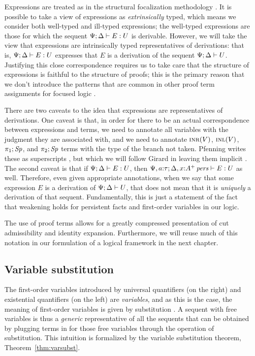 Expressions are treated as in the structural focalization methodology
\cite{simmons11structural}. It is possible to take a view of
expressions as {\it extrinsically} typed, which means we consider both
well-typed and ill-typed expressions; the well-typed expressions
are those for which the sequent ${\Psi}; {\Delta} \vdash {E} : {U}$ is
derivable. However, we will take the view that expressions are
intrinsically typed representatives of derivations: that is,
${\Psi}; {\Delta} \vdash {E} : {U}$ expresses that $E$ is a derivation
of the sequent ${\Psi};{\Delta} \vdash {U}$. Justifying this close
correspondence requires us to take care that the structure of
expressions is faithful to the structure of proofs; this is the
primary reason that we don't introduce the patterns that are common in
other proof term assignments for focused logic
\cite{watkins02concurrent,licata08focusing,krishnaswami09focusing}.

There are two caveats to the idea that expressions are representatives
of derivations. One caveat is that, in order for there to be an actual
correspondence between expressions and terms, we need to annotate all
variables with the judgment they are associated with, and we need to
annotate $\textsc{inr}({V})$, $\textsc{inl}({V})$, $\pi_1;{{\it Sp}}$, and $\pi_2;{{\it Sp}}$
terms with the type of the branch not taken. Pfenning writes these as
superscripts \cite{pfenning08church}, but which we will follow Girard
in leaving them implicit \cite{girard89proofs}. The second caveat is
that if ${\Psi}; {\Delta} \vdash {E} : {U}$, then ${\Psi,
  a{:}\tau}; {\Delta, x{:}{A^+}\,{{\it pers}}} \vdash {E} : {U}$ as well. Therefore, even
given appropriate annotations, when we say that some expression $E$ is
a derivation of ${\Psi};{\Delta} \vdash {U}$, that does not mean that it is
{\it uniquely} a derivation of that sequent. Fundamentally, this is
just a statement of the fact that weakening holds for persistent facts
and first-order variables in our logic.

The use of proof terms allows for a greatly compressed presentation of
cut admissibility and identity expansion. Furthermore, we will reuse
much of this notation in our formulation of a logical framework in the
next chapter. 

\subsection{Variable substitution}

The first-order variables introduced by universal quantifiers (on the
right) and existential quantifiers (on the left) are {\it variables},
and as this is the case, the meaning of first-order variables is given
by substitution \cite[Chapter 1]{harper12practical}. A sequent with
free variables is thus a {\it generic} representative of all the
sequents that can be obtained by plugging terms in for those free
variables through the operation of substitution. This intuition is
formalized by the variable substitution theorem,
Theorem~\ref{thm:varsubst}.

